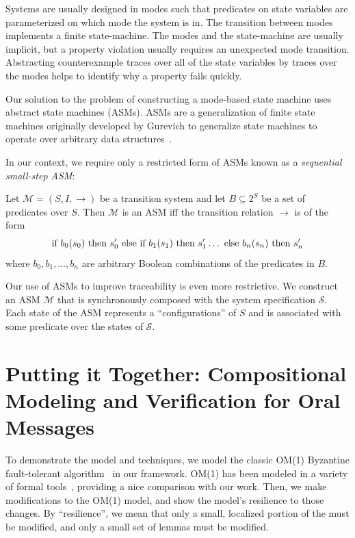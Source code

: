 \documentclass{llncs/llncs}
\begin{document}
Systems are usually designed in modes such that predicates on state variables are parameterized on which mode the system is in. The transition between modes implements a finite state-machine. The modes and the state-machine are usually implicit, but a property violation usually requires an unexpected mode transition. Abstracting counterexample traces over all of the state variables by traces over the modes helps to identify why a property fails quickly.

Our solution to the problem of constructing a mode-based state machine uses abstract state machines (ASMs). ASMs are a generalization of finite state machines originally developed by Gurevich to generalize state machines to operate over arbitrary data structures~\cite{asm}.

In our context, we require only a restricted form of ASMs known as a \emph{sequential small-step ASM}:

\begin{definition}
Let $\mathcal{M} = (S, I, \rightarrow)$ be a transition system and let $B \subseteq 2^S$ be a set of predicates over $S$. Then $\mathcal{M}$ is an ASM iff the transition relation $\rightarrow$ is of the form
$$\textnormal{if } b_0(s_0) \textnormal{ then } s'_0 \textnormal{ else if } b_1(s_1) \textnormal{ then } s'_1 \ldots \textnormal{ else } b_n(s_n) \textnormal{ then } s'_n$$
\noindent
where $b_0, b_1, \ldots, b_n$ are arbitrary Boolean combinations of the predicates in $B$.
\end{definition}

Our use of ASMs to improve traceability is even more restrictive. We construct an ASM $\mathcal{M}$ that is synchronously composed with the system specification $\mathcal{S}$. Each state of the ASM represents a ``configurations'' of $S$ and is associated with some predicate over the states of $\mathcal{S}$.


\section{Putting it Together: Compositional Modeling and Verification for Oral Messages}\label{sec:byz}

To demonstrate the model and techniques, we model the classic OM(1) Byzantine fault-tolerant algorithm~\cite{} in our framework. OM(1) has been modeled in a variety of formal tools~\cite{}, providing a nice comparison with our work. Then, we make modifications to the OM(1) model, and show the model's resilience to those changes. By ``resilience'', we mean that only a small, localized portion of the must be modified, and only a small set of lemmas must be modified.
\end{document}
